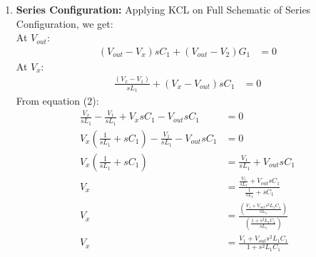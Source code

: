 \begin{enumerate}
    \paragraph{Total Parallel Response:}
      \begin{align*}
        V_{out} &= V_{out_1} + V_{out_2} \\
                &= H_1(s)V_{1} + H_2(s)V_{2} \\
                &= \left(\frac{G_1}{G_1 + \frac{1}{sL_1} + sC_1}\right)V_{1} + \left(\frac{\frac{1}{sL_1} + sC_1}{G_1 + \frac{1}{sL_1} + sC_1}\right)V_{2} \\
        V_{out} &= \underbrace{\frac{G_1}{G_1 + \frac{1}{sL_1} + sC_1}V_{1}}_{\text{Band Pass Character}} + \underbrace{\frac{\frac{1}{sL_1} + sC_1}{G_1 + \frac{1}{sL_1} + sC_1}V_{2}}_{\text{Band Stop Character}}
      \end{align*}
  \item \textbf{Series Configuration:}
    Applying KCL on Full Schematic of Series Configuration, we get: \\
    At \(V_{out}\):
    \begin{align*}
      (V_{out} - V_{x})sC_1 + (V_{out} - V_{2}){G_1} &= 0 \tag{1}
    \end{align*}
    At \(V_{x}\):
    \begin{align*}
      \frac{(V_{x} - V_{1})}{sL_1} + (V_{x} - V_{out})sC_1 &= 0 \tag{2}
    \end{align*}
    From equation (2):
    \begin{align*}
      \frac{V_{x}}{sL_1} - \frac{V_{1}}{sL_1} + V_{x}sC_1 - V_{out}sC_1 &= 0 \\
      V_{x}(\frac{1}{sL_1} + sC_1) - \frac{V_{1}}{sL_1} - V_{out}sC_1 &= 0 \\
      V_{x}(\frac{1}{sL_1} + sC_1) &= \frac{V_{1}}{sL_1} + V_{out}sC_1 \\
      V_{x} &= \frac{\frac{V_{1}}{sL_1} + V_{out}sC_1}{\frac{1}{sL_1} + sC_1} \\
      V_{x} &= \frac{\left(\frac{V_{1} + V_{out}s^2 L_1 C_1}{s L_1}\right)}{\left(\frac{1 + s^2 L_1 C_1}{s L_1}\right)} \\
      V_{x} &= \frac{V_{1} + V_{out}s^2 L_1 C_1}{1 + s^2 L_1 C_1} \tag{3}
    \end{align*}

\end{enumerate}
